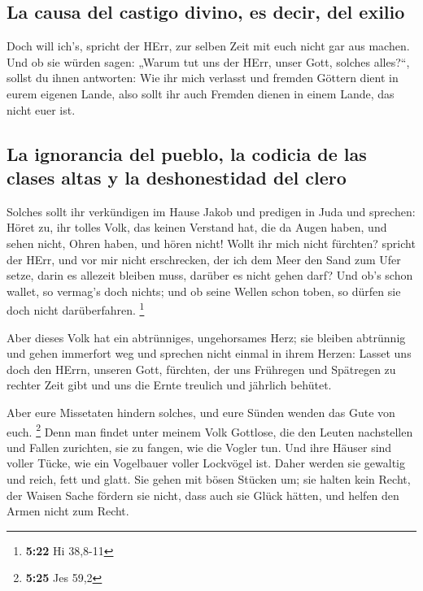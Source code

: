 \hypertarget{la-causa-del-castigo-divino-es-decir-del-exilio}{%
\subsection{La causa del castigo divino, es decir, del
exilio}\label{la-causa-del-castigo-divino-es-decir-del-exilio}}

 Doch will ich's, spricht der HErr, zur selben Zeit mit
euch nicht gar aus machen.  Und ob sie würden sagen:
„Warum tut uns der HErr, unser Gott, solches alles?{}``, sollst du ihnen
antworten: Wie ihr mich verlasst und fremden Göttern dient in eurem
eigenen Lande, also sollt ihr auch Fremden dienen in einem Lande, das
nicht euer ist.

\hypertarget{la-ignorancia-del-pueblo-la-codicia-de-las-clases-altas-y-la-deshonestidad-del-clero}{%
\subsection{La ignorancia del pueblo, la codicia de las clases altas y
la deshonestidad del
clero}\label{la-ignorancia-del-pueblo-la-codicia-de-las-clases-altas-y-la-deshonestidad-del-clero}}

 Solches sollt ihr verkündigen im Hause Jakob und
predigen in Juda und sprechen:  Höret zu, ihr tolles
Volk, das keinen Verstand hat, die da Augen haben, und sehen nicht,
Ohren haben, und hören nicht!  Wollt ihr mich nicht
fürchten? spricht der HErr, und vor mir nicht erschrecken, der ich dem
Meer den Sand zum Ufer setze, darin es allezeit bleiben muss, darüber es
nicht gehen darf? Und ob's schon wallet, so vermag's doch nichts; und ob
seine Wellen schon toben, so dürfen sie doch nicht darüberfahren.
\footnote{\textbf{5:22} Hi 38,8-11}

 Aber dieses Volk hat ein abtrünniges, ungehorsames Herz;
sie bleiben abtrünnig und gehen immerfort weg  und
sprechen nicht einmal in ihrem Herzen: Lasset uns doch den HErrn,
unseren Gott, fürchten, der uns Frühregen und Spätregen zu rechter Zeit
gibt und uns die Ernte treulich und jährlich behütet.

 Aber eure Missetaten hindern solches, und eure Sünden
wenden das Gute von euch. \footnote{\textbf{5:25} Jes 59,2}
 Denn man findet unter meinem Volk Gottlose, die den
Leuten nachstellen und Fallen zurichten, sie zu fangen, wie die Vogler
tun.  Und ihre Häuser sind voller Tücke, wie ein
Vogelbauer voller Lockvögel ist. Daher werden sie gewaltig und reich,
fett und glatt.  Sie gehen mit bösen Stücken um; sie
halten kein Recht, der Waisen Sache fördern sie nicht, dass auch sie
Glück hätten, und helfen den Armen nicht zum Recht.


